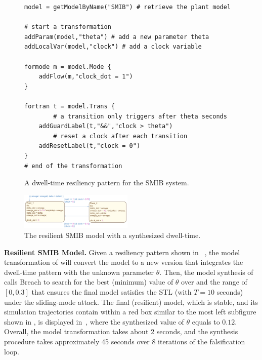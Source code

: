 \begin{figure}[!t]%
\begin{lstlisting}[basicstyle=\ttfamily\footnotesize, numbers=none]
model = getModelByName("SMIB") # retrieve the plant model
	
# start a transformation  
addParam(model,"theta") # add a new parameter theta
addLocalVar(model,"clock") # add a clock variable
	
formode m = model.Mode {
    addFlow(m,"clock_dot = 1")
}

fortran t = model.Trans {
		# a transition only triggers after theta seconds
    addGuardLabel(t,"&&","clock > theta") 
		# reset a clock after each transition
    addResetLabel(t,"clock = 0") 
}
# end of the transformation
\end{lstlisting}
\caption{A dwell-time resiliency pattern for the SMIB system.}%
%
\end{figure}


\begin{figure}[t!]%
	\centering%
    \includegraphics[width=0.48\textwidth]{image/smib_plant_model_res}%
	\caption{The resilient SMIB model with a synthesized dwell-time.}%
\end{figure}%

\vspace{0.5em}
\noindent
{\bf Resilient SMIB Model.} Given a resiliency pattern shown in ~, the model transformation of \toolreaffirm will convert the model to a new version that integrates the dwell-time pattern with the unknown parameter $\theta$.
%
Then, the model synthesis of \toolreaffirm calls Breach to search for the best (\ie minimum) value of $\theta$ over and the range of $[0, 0.3]$ that ensures the final model satisfies the STL  (with $T = 10$ seconds) under the sliding-mode attack. The final (resilient) model, which is stable, and its simulation trajectories contain within a red box similar to the most left subfigure shown in , is displayed in~, where the synthesized value of $\theta$ equals to $0.12$. Overall, the model transformation takes about 2 seconds, and the synthesis procedure takes approximately 45 seconds over 8 iterations of the falsification loop.


